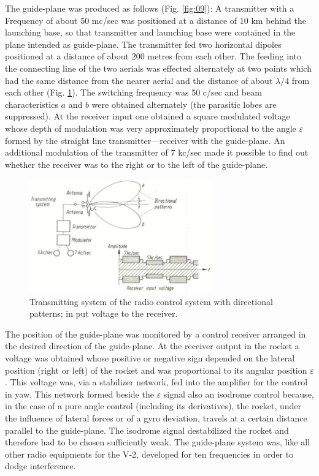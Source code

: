\documentclass[12pt, a4paper]{article}
\begin{document}
The guide-plane was produced as follows (Fig. \ref{fig:09}): A transmitter with a Frequency of about 50 mc/sec was positioned at a distance of 10 km behind the launching base, so that transmitter and launching base were contained in the plane intended as guide-plane. The transmitter fed two horizontal dipoles positioned at a distance of about 200 metres from each other. The feeding into the connecting line of the two aerials was effected alternately at two points which had the same distance from the nearer aerial and the distance of about $\lambda/4$ from each other (Fig. \ref{fig:10}). The switching frequency was 50 c/sec and beam characteristics $a$ and $b$ were obtained alternately (the parasitic lobes are suppressed). At the receiver input one obtained a square modulated voltage whose depth of modulation was very approximately proportional to the angle $\varepsilon$ formed by the straight line transmitter—receiver with the guide-plane. An additional modulation of the transmitter of 7 kc/sec made it possible to find out whether the receiver was to the right or to the left of the guide-plane.

\begin{figure}[ht]
  \centering
  \includegraphics[width=0.7\textwidth]{figs/ctrl-10.png}
  \caption{Transmitting system of the radio control system with directional patterns; in put voltage to the receiver.}
  \label{fig:10}
\end{figure}

The position of the guide-plane was monitored by a control receiver arranged in the desired direction of the guide-plane. At the receiver output in the rocket a voltage was obtained whose positive or negative sign depended on the lateral position (right or left) of the rocket and was proportional to its angular position $\varepsilon$. This voltage was, via a stabilizer network, fed into the amplifier for the control in yaw. This network formed beside the $\varepsilon$ signal also an isodrome control because, in the case of a pure angle control (including its derivatives), the rocket, under the influence of lateral forces or of a gyro deviation, travels at a certain distance parallel to the guide-plane. The isodrome signal destabilized the rocket and therefore had to be chosen sufficiently weak. The guide-plane system was, like all other radio equipments for the V-2, developed for ten frequencies in order to dodge interference.
\end{document}
